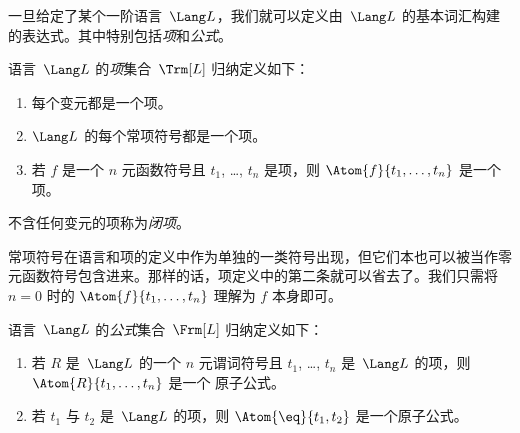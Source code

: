 \documentclass[../../../include/open-logic-section]{subfiles}
\begin{document}


一旦给定了某个一阶语言~$\Lang L$，我们就可以定义由~$\Lang L$ 的基本词汇构建的表达式。其中特别包括\emph{项}和\emph{公式}。

\begin{defn}[项]
语言~$\Lang L$ 的\emph{项}集合~$\Trm[L]$ 归纳定义如下：
\begin{enumerate}
\item 每个变元都是一个项。
\item $\Lang L$ 的每个常项符号都是一个项。
\item 若 $f$ 是一个 $n$ 元函数符号且 $t_1$, \dots, $t_n$
  是项，则 $\Atom{f}{t_1, \ldots, t_n}$ 是一个项。
\end{enumerate}
不含任何变元的项称为\emph{闭项}。
\end{defn}

\begin{explain}
常项符号在语言和项的定义中作为单独的一类符号出现，但它们本也可以被当作零元函数符号包含进来。那样的话，项定义中的第二条就可以省去了。我们只需将 $n = 0$ 时的 $\Atom{f}{t_1, \ldots, t_n}$ 理解为 $f$ 本身即可。
\end{explain}

\begin{defn}[公式]
语言~$\Lang L$ 的\emph{公式}集合~$\Frm[L]$ 归纳定义如下：
\begin{enumerate}


\item 若 $R$ 是~$\Lang L$ 的一个 $n$ 元谓词符号且 $t_1$, \dots,
  $t_n$ 是~$\Lang L$ 的项，则 $\Atom{R}{t_1,\ldots, t_n}$ 是一个
  原子公式。

\item 若 $t_1$ 与 $t_2$ 是~$\Lang L$ 的项，则 $\Atom{\eq}{t_1, t_2}$
  是一个原子公式。








\end{enumerate}
\end{defn}
\end{document}

